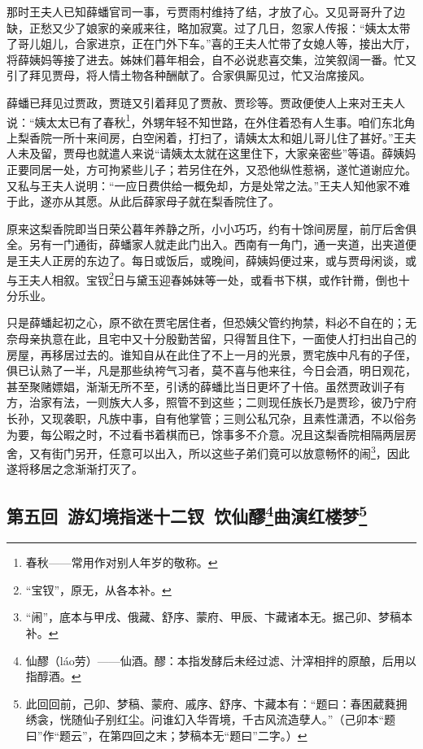 \par 那时王夫人已知薛蟠官司一事，亏贾雨村维持了结，才放了心。又见哥哥升了边缺，正愁又少了娘家的亲戚来往，略加寂寞。过了几日，忽家人传报：“姨太太带了哥儿姐儿，合家进京，正在门外下车。”喜的王夫人忙带了女媳人等，接出大厅，将薛姨妈等接了进去。姊妹们暮年相会，自不必说悲喜交集，泣笑叙阔一番。忙又引了拜见贾母，将人情土物各种酬献了。合家俱厮见过，忙又治席接风。
\par 薛蟠已拜见过贾政，贾琏又引着拜见了贾赦、贾珍等。贾政便使人上来对王夫人说：“姨太太已有了春秋\footnote{春秋——常用作对别人年岁的敬称。}，外甥年轻不知世路，在外住着恐有人生事。咱们东北角上梨香院一所十来间房，白空闲着，打扫了，请姨太太和姐儿哥儿住了甚好。”王夫人未及留，贾母也就遣人来说“请姨太太就在这里住下，大家亲密些”等语。薛姨妈正要同居一处，方可拘紧些儿子；若另住在外，又恐他纵性惹祸，遂忙道谢应允。又私与王夫人说明：“一应日费供给一概免却，方是处常之法。”王夫人知他家不难于此，遂亦从其愿。从此后薛家母子就在梨香院住了。
\par 原来这梨香院即当日荣公暮年养静之所，小小巧巧，约有十馀间房屋，前厅后舍俱全。另有一门通街，薛蟠家人就走此门出入。西南有一角门，通一夹道，出夹道便是王夫人正房的东边了。每日或饭后，或晚间，薛姨妈便过来，或与贾母闲谈，或与王夫人相叙。宝钗\footnote{“宝钗”，原无，从各本补。}日与黛玉迎春姊妹等一处，或看书下棋，或作针黹，倒也十分乐业。
\par 只是薛蟠起初之心，原不欲在贾宅居住者，但恐姨父管约拘禁，料必不自在的；无奈母亲执意在此，且宅中又十分殷勤苦留，只得暂且住下，一面使人打扫出自己的房屋，再移居过去的。谁知自从在此住了不上一月的光景，贾宅族中凡有的子侄，俱已认熟了一半，凡是那些纨袴气习者，莫不喜与他来往，今日会酒，明日观花，甚至聚赌嫖娼，渐渐无所不至，引诱的薛蟠比当日更坏了十倍。虽然贾政训子有方，治家有法，一则族大人多，照管不到这些；二则现任族长乃是贾珍，彼乃宁府长孙，又现袭职，凡族中事，自有他掌管；三则公私冗杂，且素性潇洒，不以俗务为要，每公暇之时，不过看书着棋而已，馀事多不介意。况且这梨香院相隔两层房舍，又有街门另开，任意可以出入，所以这些子弟们竟可以放意畅怀的闹\footnote{“闹”，底本与甲戌、俄藏、舒序、蒙府、甲辰、卞藏诸本无。据己卯、梦稿本补。}，因此遂将移居之念渐渐打灭了。



\subsection*{第五回\ 游幻境指迷十二钗\ 饮仙醪\footnote{仙醪（láo劳）——仙酒。醪：本指发酵后未经过滤、汁滓相拌的原酿，后用以指醇酒。}曲演红楼梦\footnote{此回回前，己卯、梦稿、蒙府、戚序、舒序、卞藏本有：“题曰：春困葳蕤拥绣衾，恍随仙子别红尘。问谁幻入华胥境，千古风流造孽人。”（己卯本“题曰”作“题云”，在第四回之末；梦稿本无“题曰”二字。）}}


